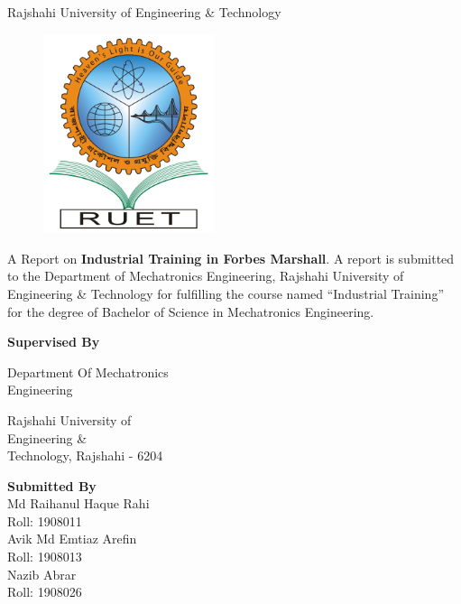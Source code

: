 \begin{center}
    Rajshahi University of Engineering \& Technology
\end{center}
\begin{figure}[h!]
    \centering
    \includegraphics[width=5cm]{figs/RUET.png}
    \label{fig:ruet1}
\end{figure}
\setlength{\columnsep}{0.1\textwidth}
A Report on \textbf{Industrial Training in Forbes Marshall}. A report is submitted to the Department of Mechatronics Engineering, Rajshahi University of Engineering \& Technology for fulfilling the course named “Industrial Training” for the degree of Bachelor of Science in Mechatronics Engineering. 

\begin{center}
\begin{multicols}{2}
    \noindent \textbf{Supervised By}


    \noindent Department Of Mechatronics\\    
    Engineering

    \noindent Rajshahi University of\\
    Engineering \&\\
    Technology, Rajshahi - 6204
    \columnbreak
    
    \noindent \textbf{Submitted By}\\
    Md Raihanul Haque Rahi\\
    Roll: 1908011\\

    \noindent Avik Md Emtiaz Arefin\\
    Roll: 1908013\\

    \noindent Nazib Abrar\\
    Roll: 1908026\\


\end{multicols}
\end{center}